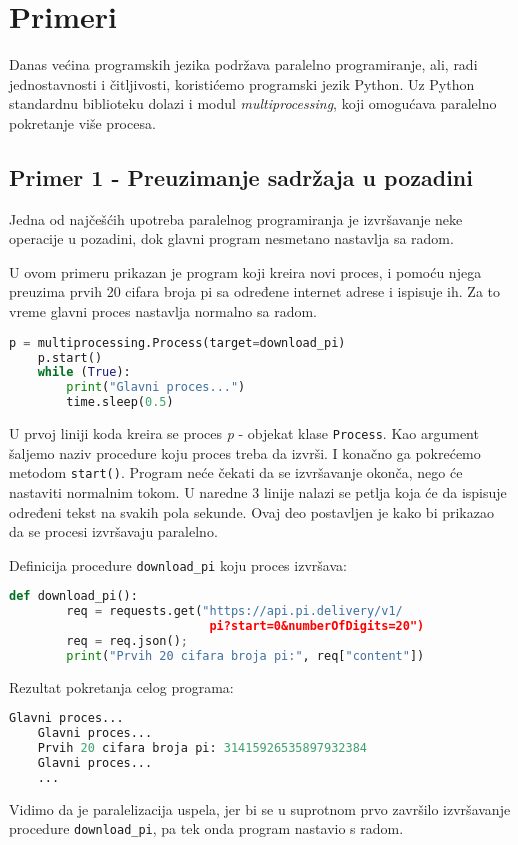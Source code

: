 \documentclass[a4paper]{article}
\begin{document}
{	
	\section{Primeri}
    Danas većina programskih jezika podržava paralelno programiranje, ali, radi jednostavnosti i čitljivosti, koristićemo programski jezik Python. Uz Python standardnu biblioteku dolazi i modul \emph{multiprocessing}, koji omogućava paralelno pokretanje više procesa.
    \subsection{Primer 1 - Preuzimanje sadržaja u pozadini}
    Jedna od najčešćih upotreba paralelnog programiranja je izvršavanje neke operacije u pozadini, dok glavni program nesmetano nastavlja sa radom. 
    \par U ovom primeru prikazan je program koji kreira novi proces, i pomoću njega preuzima prvih 20 cifara broja pi sa određene internet adrese i ispisuje ih. Za to vreme glavni proces nastavlja normalno sa radom.
    \begin{lstlisting}[showstringspaces=false, language=Python]
    p = multiprocessing.Process(target=download_pi)
    p.start()
    while (True):
        print("Glavni proces...")
        time.sleep(0.5)
    \end{lstlisting}
    U prvoj liniji koda kreira se proces \emph{p} - objekat klase \lstinline{Process}. Kao argument šaljemo naziv procedure koju proces treba da izvrši. I konačno ga pokrećemo metodom \lstinline{start()}. Program neće čekati da se izvršavanje okonča, nego će nastaviti normalnim tokom. U naredne 3 linije nalazi se petlja koja će da ispisuje određeni tekst na svakih pola sekunde. Ovaj deo postavljen je kako bi prikazao da se procesi izvršavaju paralelno.
    \par Definicija procedure \lstinline{download_pi} koju proces izvršava:
    
    \begin{lstlisting}[showstringspaces=false, language=Python]
    def download_pi():
        req = requests.get("https://api.pi.delivery/v1/
                            pi?start=0&numberOfDigits=20")
        req = req.json();
        print("Prvih 20 cifara broja pi:", req["content"])
    \end{lstlisting}
    \par Rezultat pokretanja celog programa:
    \begin{lstlisting}[showstringspaces=false, language=Python]
    Glavni proces...
    Glavni proces...
    Prvih 20 cifara broja pi: 31415926535897932384
    Glavni proces...
    ...
    \end{lstlisting}
    Vidimo da je paralelizacija uspela, jer bi se u suprotnom prvo završilo izvršavanje procedure \lstinline{download_pi}, pa tek onda program nastavio s radom.
}
\end{document}

